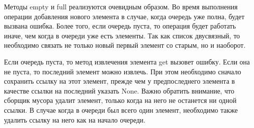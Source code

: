 Методы empty и full реализуются очевидным образом.
Во время выполнения операции добавления нового элемента в случае, когда очередь уже полна, будет вызвана ошибка. Более того, если очередь пуста, то операция будет работать иначе, чем когда в очереди уже есть элементы. Так как список двусвязный, то необходимо связать не только новый первый элемент со старым, но и наоборот.

Если очередь пуста, то метод извлечения элемента get вызовет ошибку. Если она не пуста, то последний элемент можно извлечь. При этом необходимо сначало сохранить ссылку на этот элемент, прежде чем у предпоследнего элемента в качестве ссылки на последний указать None. Важно обратить внимание, что сборщик мусора удалит элемент, только когда на него не останется ни одной ссылки. В случае когда в очереди был всего один элемент, необходимо также удалить ссылку на него как на начало очереди.



